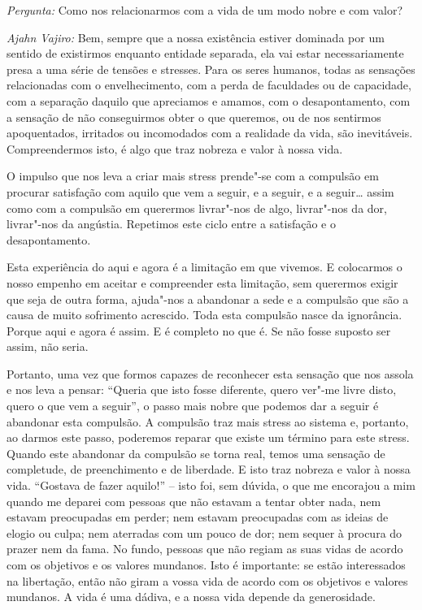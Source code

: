 \bigskip

\emph{Pergunta:} Como nos relacionarmos com a vida de um modo nobre e com valor?

\emph{Ajahn Vajiro:} Bem, sempre que a nossa existência estiver dominada por um
sentido de existirmos enquanto entidade separada, ela vai estar necessariamente
presa a uma série de tensões e stresses. Para os seres humanos, todas as
sensações relacionadas com o envelhecimento, com a perda de faculdades ou de
capacidade, com a separação daquilo que apreciamos e amamos, com o
desapontamento, com a sensação de não conseguirmos obter o que queremos, ou de
nos sentirmos apoquentados, irritados ou incomodados com a realidade da vida,
são inevitáveis. Compreendermos isto, é algo que traz nobreza e valor à nossa
vida.

\enlargethispage{\baselineskip}

O impulso que nos leva a criar mais stress prende"-se com a compulsão em procurar
satisfação com aquilo que vem a seguir, e a seguir, e a seguir\ldots{} assim
como com a compulsão em querermos livrar"-nos de algo, livrar"-nos da dor,
livrar"-nos da angústia. Repetimos este ciclo entre a satisfação e o
desapontamento.

Esta experiência do aqui e agora é a limitação em que vivemos. E colocarmos o
nosso empenho em aceitar e compreender esta limitação, sem querermos exigir que
seja de outra forma, ajuda"-nos a abandonar a sede e a compulsão que são a causa
de muito sofrimento acrescido. Toda esta compulsão nasce da ignorância. Porque
aqui e agora é assim. E é completo no que é. Se não fosse suposto ser assim, não
seria.

Portanto, uma vez que formos capazes de reconhecer esta sensação que nos assola
e nos leva a pensar: ``Queria que isto fosse diferente, quero ver"-me livre disto,
quero o que vem a seguir'', o passo mais nobre que podemos dar a seguir é
abandonar esta compulsão. A compulsão traz mais stress ao sistema e, portanto,
ao darmos este passo, poderemos reparar que existe um término para este stress.
Quando este abandonar da compulsão se torna real, temos uma sensação de
completude, de preenchimento e de liberdade. E isto traz nobreza e valor à nossa
vida. ``Gostava de fazer aquilo!'' -- isto foi, sem dúvida, o que me encorajou a
mim quando me deparei com pessoas que não estavam a tentar obter nada, nem
estavam preocupadas em perder; nem estavam preocupadas com as ideias de elogio
ou culpa; nem aterradas com um pouco de dor; nem sequer à procura do prazer nem
da fama. No fundo, pessoas que não regiam as suas vidas de acordo com os
objetivos e os valores mundanos. Isto é importante: se estão interessados na
libertação, então não giram a vossa vida de acordo com os objetivos e valores
mundanos. A vida é uma dádiva, e a nossa vida depende da generosidade.

